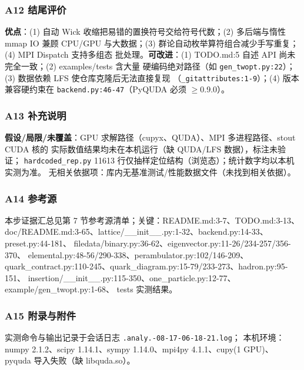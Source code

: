 \documentclass[UTF8]{ctexart}
\begin{document}
\subsubsection{A12 结尾评价}
\textbf{优点}：(1) 自动 Wick 收缩把易错的置换符号交给符号代数；(2) 多后端与惰性 mmap IO
兼顾 CPU/GPU 与大数据；(3) 群论自动枚举算符组合减少手写重复；(4) MPI Dispatch 支持多组态
批处理。\textbf{可改进}：(1) TODO.md:5 自述 API 尚未完全一致；(2) examples/tests 含大量
硬编码绝对路径（如 \texttt{\nolinkurl{gen_twopt.py:22}}）；(3) 数据依赖 LFS 使仓库克隆后无法直接复现
（\texttt{\nolinkurl{_gitattributes:1-9}}）；(4) 版本兼容硬约束在 \texttt{\nolinkurl{backend.py:46-47}}（PyQUDA
必须 $\ge$0.9.0）。

\subsubsection{A13 补充说明}
\textbf{假设/局限/未覆盖}：GPU 求解路径（cupyx、QUDA）、MPI 多进程路径、stout CUDA 核的
实际数值结果均未在本机运行（缺 QUDA/LFS 数据），标注\textcolor{warn}{未验证}；
\texttt{hardcoded\_rep.py} 11613 行仅抽样定位结构（浏览态）；统计数字均以本机实测为准。
无相关依据项：库内无基准测试/性能数据文件（未找到相关依据）。

\subsubsection{A14 参考源}
本步证据汇总见第 7 节参考源清单；关键：README.md:3-7、TODO.md:3-13、
doc/README.md:3-65、lattice/\_\_init\_\_.py:1-32、backend.py:14-33、preset.py:44-181、
filedata/binary.py:36-62、eigenvector.py:11-26/234-257/356-370、
elemental.py:48-56/290-338、perambulator.py:102/146-209、
quark\_contract.py:110-245、quark\_diagram.py:15-79/233-273、hadron.py:95-151、
insertion/\_\_init\_\_.py:115-350、one\_particle.py:12-77、example/gen\_twopt.py:1-68、
tests 实测结果。

\subsubsection{A15 附录与附件}
实测命令与输出记录于会话日志 \texttt{.analy.-08-17-06-18-21.log}；
本机环境：numpy 2.1.2、scipy 1.14.1、sympy 1.14.0、mpi4py 4.1.1、cupy(1 GPU)、
pyquda 导入失败（缺 libquda.so）。

\end{document}
